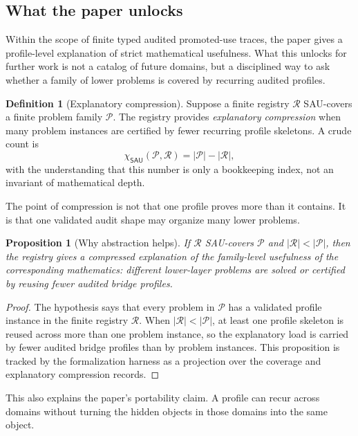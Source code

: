 \documentclass[11pt]{article}
\newcommand{\SAU}{\mathsf{SAU}}
\newtheorem{proposition}[theorem]{Proposition}
\theoremstyle{definition}
\newtheorem{definition}[theorem]{Definition}
\begin{document}
\subsection{What the paper unlocks}
\label{subsec:outlook-unlocks}

Within the scope of finite typed audited promoted-use traces, the paper gives a
profile-level explanation of strict mathematical usefulness.  What this unlocks
for further work is not a catalog of future domains, but a disciplined way to ask
whether a family of lower problems is covered by recurring audited profiles.

\begin{definition}[Explanatory compression]
\label{def:sau-explanatory-compression}
Suppose a finite registry \(\mathcal R\) SAU-covers a finite problem family \(\mathcal P\).  The registry provides \emph{explanatory compression} when many problem instances are certified by fewer recurring profile skeletons.  A crude count is
\[
\chi_{\SAU}(\mathcal P,\mathcal R)=|\mathcal P|-|\mathcal R|,
\]
with the understanding that this number is only a bookkeeping index, not an invariant of mathematical depth.
\end{definition}

The point of compression is not that one profile proves more than it contains.
It is that one validated audit shape may organize many lower problems.

\begin{proposition}[Why abstraction helps]
\label{prop:sau-why-abstraction-helps}
If \(\mathcal R\) SAU-covers \(\mathcal P\) and \(|\mathcal R|<|\mathcal P|\), then the registry gives a compressed explanation of the family-level usefulness of the corresponding mathematics: different lower-layer problems are solved or certified by reusing fewer audited bridge profiles.
\end{proposition}

\begin{proof}
The hypothesis says that every problem in \(\mathcal P\) has a validated
profile instance in the finite registry \(\mathcal R\).  When
\(|\mathcal R|<|\mathcal P|\), at least one profile skeleton is reused across
more than one problem instance, so the explanatory load is carried by fewer
audited bridge profiles than by problem instances.  This proposition is tracked
by the formalization harness as a projection over the coverage and explanatory
compression records.
\end{proof}

This also explains the paper's portability claim.  A profile can recur across
domains without turning the hidden objects in those domains into the same object.
\end{document}
